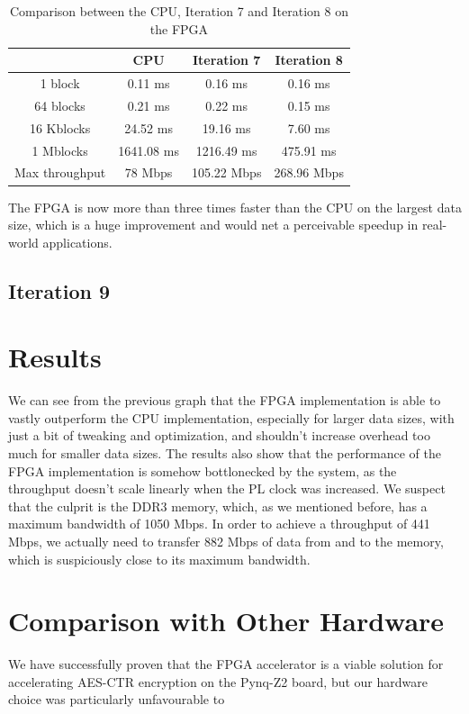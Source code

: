 \documentclass[12pt,oneside,a4paper]{article}
\begin{document}
\begin{table}[h!]
	\centering
	\begin{tabular}{cccc}
		\toprule
		 & CPU & Iteration 7 & Iteration 8 \\
		\midrule
		1 block & 0.11 ms & 0.16 ms & 0.16 ms \\
		64 blocks & 0.21 ms & 0.22 ms & 0.15 ms \\
		16 Kblocks & 24.52 ms & 19.16 ms & 7.60 ms \\
		1 Mblocks & 1641.08 ms & 1216.49 ms & 475.91 ms \\
		Max throughput & 78 Mbps & 105.22 Mbps & 268.96 Mbps \\
		\bottomrule
	\end{tabular}
	\caption{Comparison between the CPU, Iteration 7 and Iteration 8 on the FPGA}
\end{table}

The FPGA is now more than three times faster than the CPU on the largest data size, which is a huge improvement and would net a perceivable speedup in real-world applications.

\subsection{Iteration 9} \label{subsec:iter9}


\section{Results} \label{sec:results}
We can see from the previous graph that the FPGA implementation is able to vastly outperform the CPU implementation, especially for larger data sizes, with just a bit of tweaking and optimization, and shouldn't increase overhead too much for smaller data sizes.
The results also show that the performance of the FPGA implementation is somehow bottlonecked by the system, as the throughput doesn't scale linearly when the PL clock was increased.
We suspect that the culprit is the DDR3 memory, which, as we mentioned before, has a maximum bandwidth of 1050 Mbps. In order to achieve a throughput of 441 Mbps, we actually need to transfer 882 Mbps of data from and to the memory, which is suspiciously close to its maximum bandwidth.

\section{Comparison with Other Hardware} \label{sec:conclusions}
We have successfully proven that the FPGA accelerator is a viable solution for accelerating AES-CTR encryption on the Pynq-Z2 board, but our hardware choice was particularly unfavourable to 

\printbibliography
\end{document}
